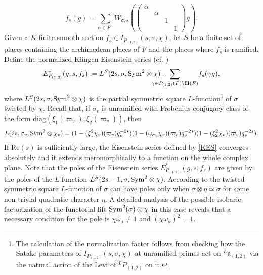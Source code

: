 \documentclass[11pt, reqno]{amsart}
\theoremstyle{plain}
\theoremstyle{definition}
\theoremstyle{remark}
\theoremstyle{plain}
\def\H{{H}}
\def\H{\mathbf{H}}
\begin{document}
\begin{equation}\label{FourExpf}f_s(g) = \sum_{\alpha\in F^{\times}}W_{\sigma,s}\left(\left(\begin{smallmatrix}\alpha& & & \\ &\alpha& & \\ & &1& \\ & & &1\end{smallmatrix}\right)g\right).\end{equation}
Given a $K$-finite smooth section $ f_s \in I_{P_{(1,2)}}(s,\sigma,\chi)$, let $S$ be a finite set of places containing the archimedean places of $F$ and the places where $f_s$ is ramified. Define the normalized Klingen Eisenstein series (cf. \cite[p.390]{BumpBook}) \begin{align}\label{KES}
    E^*_{P_{(1,2)}}(g,s, f_s) :=   L^{S}(2s,\sigma,{\rm Sym}^2 \otimes \chi) \cdot \!\!\!\!\!\!\!\!\!\!\!\! {\sum_{\gamma \in {P_{(1,2)}}(F) \backslash \H(F)}} f_s(\gamma g),
\end{align}  
where $L^{S}(2s,\sigma,{\rm Sym}^2 \otimes \chi)$ is the partial symmetric square $L$-function\footnote{The calculation of the normalization factor follows from checking how the Satake parameters of $I_{P_{(1,2)}}(s,\sigma,\chi)$ at unramified primes act on $^L\mathfrak{n}_{{(1,2)}}$ via the natural action of the Levi of $^LP_{(1,2)}$ on it.} of $\sigma$ twisted by $\chi$.  Recall that, if $\sigma_v$ is unramified with Frobenius conjugacy class of the form $\mathrm{diag}(\xi_1(\varpi_{v}),\xi_2(\varpi_v))$, then 
\begin{equation}\label{LfunctionSigma}L(2s,\sigma_v,{\rm Sym}^2 \otimes \chi_v) = (1-(\xi^{2}_1\chi_v)(\varpi_v)q_v^{-2s})(1-(\omega_{\sigma_v}\chi_v)(\varpi_v)q_v^{-2s})(1-(\xi^{2}_2\chi_v)(\varpi_v)q_v^{-2s}).\end{equation}
If $\mathrm{Re}(s)$ is sufficiently large, the Eisenstein series defined by \eqref{KES} converges absolutely and it extends meromorphically to a function on the whole complex plane. Note that the poles of the Eisenstein series $E^*_{P_{(1,2)}}(g,s, f_s)$ are given by the poles of the $L$-function $L^{S}(2s-1,\sigma ,{\rm Sym}^2 \otimes \chi)$. According to \cite[Theorem 9.3]{GelbartJacquet} the twisted symmetric square $L$-function of $\sigma$ can have poles only when $\sigma\otimes\eta \simeq \sigma$ for some non-trivial quadratic character $\eta$. A detailed analysis of the possible isobaric factorization of the functorial lift ${\rm Sym}^2(\sigma) \otimes \chi$ in this case reveals that a necessary condition for the pole is $\chi\omega_{\sigma}\neq 1$ and $(\chi\omega_{\sigma})^2 = 1$.  
\end{document}
